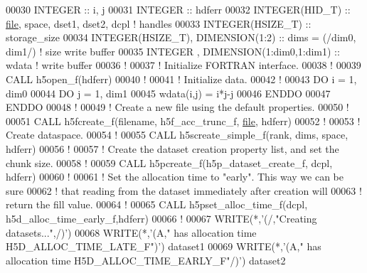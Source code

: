 \begin{DoxyCode}
00030   \textcolor{keywordtype}{INTEGER} :: i, j
00031   \textcolor{keywordtype}{INTEGER} :: hdferr
00032   \textcolor{keywordtype}{INTEGER(HID\_T)}   :: \hyperlink{structfile}{file}, space, dset1, dset2, dcpl \textcolor{comment}{! handles}
00033   \textcolor{keywordtype}{INTEGER(HSIZE\_T)} :: storage\_size
00034   \textcolor{keywordtype}{INTEGER(HSIZE\_T)}, \textcolor{keywordtype}{DIMENSION(1:2)}           :: dims = (/dim0, dim1/) \textcolor{comment}{! size write buffer}
00035   \textcolor{keywordtype}{INTEGER}         , \textcolor{keywordtype}{DIMENSION(1:dim0,1:dim1)} :: wdata \textcolor{comment}{! write buffer}
00036   \textcolor{comment}{!}
00037   \textcolor{comment}{! Initialize FORTRAN interface.}
00038   \textcolor{comment}{!}
00039   \textcolor{keyword}{CALL }h5open\_f(hdferr)
00040   \textcolor{comment}{!}
00041   \textcolor{comment}{! Initialize data.}
00042   \textcolor{comment}{!}
00043   \textcolor{keywordflow}{DO} i = 1, dim0
00044      \textcolor{keywordflow}{DO} j = 1, dim1
00045         wdata(i,j) = i*j-j
00046 \textcolor{keywordflow}{     ENDDO}
00047 \textcolor{keywordflow}{  ENDDO}
00048   \textcolor{comment}{!}
00049   \textcolor{comment}{! Create a new file using the default properties.}
00050   \textcolor{comment}{!}
00051   \textcolor{keyword}{CALL }h5fcreate\_f(filename, h5f\_acc\_trunc\_f, \hyperlink{structfile}{file}, hdferr)
00052   \textcolor{comment}{!}
00053   \textcolor{comment}{! Create dataspace. }
00054   \textcolor{comment}{!}
00055   \textcolor{keyword}{CALL }h5screate\_simple\_f(rank, dims, space, hdferr)
00056   \textcolor{comment}{!}
00057   \textcolor{comment}{! Create the dataset creation property list, and set the chunk size.}
00058   \textcolor{comment}{!}
00059   \textcolor{keyword}{CALL }h5pcreate\_f(h5p\_dataset\_create\_f, dcpl, hdferr)
00060   \textcolor{comment}{!}
00061   \textcolor{comment}{! Set the allocation time to "early".  This way we can be sure}
00062   \textcolor{comment}{! that reading from the dataset immediately after creation will}
00063   \textcolor{comment}{! return the fill value.}
00064   \textcolor{comment}{!}
00065   \textcolor{keyword}{CALL }h5pset\_alloc\_time\_f(dcpl, h5d\_alloc\_time\_early\_f,hdferr)
00066   \textcolor{comment}{!}
00067   \textcolor{keyword}{WRITE}(*,\textcolor{stringliteral}{'(/,"Creating datasets...",/)'}) 
00068   \textcolor{keyword}{WRITE}(*,\textcolor{stringliteral}{'(A," has allocation time H5D\_ALLOC\_TIME\_LATE\_F")'}) dataset1
00069   \textcolor{keyword}{WRITE}(*,\textcolor{stringliteral}{'(A," has allocation time H5D\_ALLOC\_TIME\_EARLY\_F"/)'}) dataset2

\end{DoxyCode}
